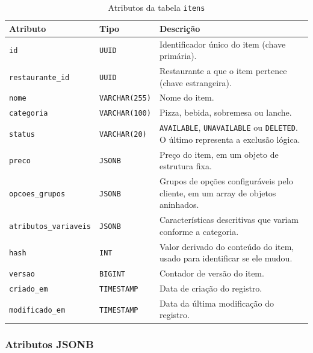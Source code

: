 \begin{table}[H]
    \centering
    \renewcommand{\arraystretch}{1.1}
    \caption{Atributos da tabela \texttt{itens}}
    \label{tab:atributos-itens}
    \small
    \begin{tabular}{|>{\raggedright\arraybackslash}p{3.4cm}|>{\raggedright\arraybackslash}p{3.2cm}|>{\raggedright\arraybackslash}p{7.6cm}|}
        \hline
        \textbf{Atributo} & \textbf{Tipo} & \textbf{Descrição} \\
        \hline
        \texttt{id} & \texttt{UUID} & Identificador único do item (chave primária). \\ \hline
        \texttt{restaurante\_id} & \texttt{UUID} & Restaurante a que o item pertence (chave estrangeira). \\ \hline
        \texttt{nome} & \texttt{VARCHAR(255)} & Nome do item. \\ \hline
        \texttt{categoria} & \texttt{VARCHAR(100)} & Pizza, bebida, sobremesa ou lanche. \\ \hline
        \texttt{status} & \texttt{VARCHAR(20)} & \texttt{AVAILABLE}, \texttt{UNAVAILABLE} ou \texttt{DELETED}. O último representa a exclusão lógica. \\ \hline
        \texttt{preco} & \texttt{JSONB} & Preço do item, em um objeto de estrutura fixa. \\ \hline
        \texttt{opcoes\_grupos} & \texttt{JSONB} & Grupos de opções configuráveis pelo cliente, em um array de objetos aninhados. \\ \hline
        \texttt{atributos\_variaveis} & \texttt{JSONB} & Características descritivas que variam conforme a categoria. \\ \hline
        \texttt{hash} & \texttt{INT} & Valor derivado do conteúdo do item, usado para identificar se ele mudou. \\ \hline
        \texttt{versao} & \texttt{BIGINT} & Contador de versão do item. \\ \hline
        \texttt{criado\_em} & \texttt{TIMESTAMP} & Data de criação do registro. \\ \hline
        \texttt{modificado\_em} & \texttt{TIMESTAMP} & Data da última modificação do registro. \\ \hline
    \end{tabular}
    \vspace{0.4em}
\end{table}

\subsubsection{Atributos JSONB}

